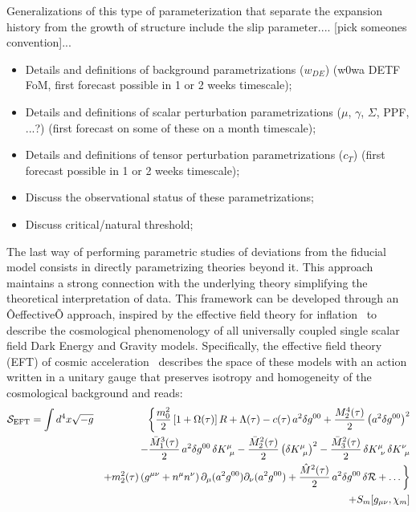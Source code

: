 Generalizations of this type of parameterization that separate the expansion history from 
the growth of structure include the slip parameter.... [pick someones convention]...
%
\begin{itemize}
\item Details and definitions of background parametrizations ($w_{DE}$) (w0wa DETF FoM, first forecast possible in 1 or 2 weeks timescale);
\item Details and definitions of scalar perturbation parametrizations ($\mu$, $\gamma$, $\Sigma$, PPF, ...?) (first forecast on some of these on a month timescale); 
\item Details and definitions of tensor perturbation parametrizations ($c_T$) (first forecast possible in 1 or 2 weeks timescale);
\item Discuss the observational status of these parametrizations;
\item Discuss critical/natural threshold;
\end{itemize}
%
The last way of performing parametric studies of deviations from the fiducial model consists in directly parametrizing theories beyond it. This approach maintains a strong connection with the underlying theory simplifying the theoretical interpretation of data. This framework can be developed through an ÔeffectiveÕ approach, inspired by the effective field theory for inflation~\cite{Creminelli:2006xe,Cheung:2007st,Weinberg:2008hq,Creminelli:2008wc,Park:2010cw,Jimenez:2011nn} to describe the cosmological phenomenology of all universally coupled single scalar field Dark Energy and Gravity models. Specifically, the effective field theory (EFT) of cosmic acceleration~\cite{Gubitosi:2012hu,Bloomfield:2012ff} describes the space of these models with an action written in a unitary gauge that preserves isotropy and homogeneity of the cosmological background and reads:
%
\begin{eqnarray} \label{Eq:EFTaction}
\mathcal{S}_{\rm EFT} = \int d^4x \sqrt{-g}&& \bigg\{ \frac{m_0^2}{2} \left[1+\Omega(\tau)\right] R + \Lambda(\tau) - c(\tau)\,a^2\delta g^{00} + \frac{M_2^4 (\tau)}{2} \left( a^2\delta g^{00} \right)^2 \nonumber \\ 
&&   - \frac{\bar{M}_1^3 (\tau)}{2} \, a^2\delta g^{00}\,\delta K{^\mu_{\,\,\mu}}  - \frac{\bar{M}_2^2 (\tau)}{2} \left( \delta {K}{^\mu_{\,\,\mu}}\right)^2   - \frac{\bar{M}_3^2 (\tau)}{2} \,\delta {K}{^\mu_{\,\,\nu}}\,\delta {K}{^\nu_{\,\,\mu}} \nonumber \\
&& + m_2^2(\tau)\left(g^{\mu\nu}+n^{\mu} n^{\nu}\right)\partial_{\mu}(a^2g^{00})\partial_{\nu}(a^2g^{00}) +\frac{\hat{M}^2(\tau)}{2} \, a^2 \delta g^{00}\,\delta \mathcal{R}+	\ldots \bigg\}  \nonumber \\
&& + S_{m} [g_{\mu \nu}, \chi_m ]
\end{eqnarray}
